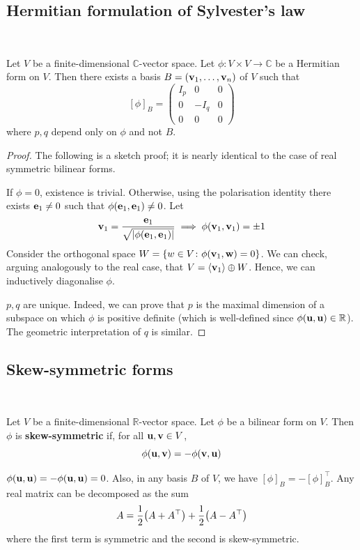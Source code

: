 \documentclass[a4paper,11pt]{article}
\begin{document}
\subsection{Hermitian formulation of Sylvester's law}
\ \vspace*{-1.5em}
\begin{theorem}
	Let \( V \) be a finite-dimensional \( \mathbb C \)-vector space.
	Let \( \phi \colon V \times V \to \mathbb C \) be a Hermitian form on \( V \).
	Then there exists a basis \( B = ({\bf v}_1, \dots, {\bf v}_n) \) of \( V \) such that
	\[
		[\phi]_B = \begin{pmatrix}
			I_p & 0    & 0 \\
			0   & -I_q & 0 \\
			0   & 0    & 0
		\end{pmatrix}
	\]
	where \( p, q \) depend only on \( \phi \) and not \( B \).
\end{theorem}
\begin{proof}
	The following is a sketch proof; it is nearly identical to the case of real symmetric bilinear forms.

	If \( \phi = 0 \), existence is trivial.
	Otherwise, using the polarisation identity there exists \( {\bf e}_1 \neq 0 \) such that \( \phi({\bf e}_1, {\bf e}_1) \neq 0 \).
	Let
	\[
		{\bf v}_1 = \frac{{\bf e}_1}{\sqrt{\abs{\phi({\bf e}_1, {\bf e}_1)}}} \implies \phi({\bf v}_1, {\bf v}_1) = \pm 1
	\]
	Consider the orthogonal space \( W = \qty{w \in V \colon \phi({\bf v}_1, {\bf w}) = 0} \).
	We can check, arguing analogously to the real case, that \( V = \left\langle{} {\bf v}_1 \right\rangle \oplus W \).
	Hence, we can inductively diagonalise \( \phi \).

	\( p, q \) are unique.
	Indeed, we can prove that \( p \) is the maximal dimension of a subspace on which \( \phi \) is positive definite (which is well-defined since \( \phi({\bf u},{\bf u}) \in \mathbb R \)).
	The geometric interpretation of \( q \) is similar.
\end{proof}

\subsection{Skew-symmetric forms}
\ \vspace*{-1.5em}
\begin{definition}
	Let \( V \) be a finite-dimensional \( \mathbb R \)-vector space.
	Let \( \phi \) be a bilinear form on \( V \).
	Then \( \phi \) is \textbf{skew-symmetric} if, for all \( {\bf u},{\bf v} \in V \),
	\[
		\phi({\bf u},{\bf v}) = -\phi({\bf v},{\bf u})
	\]
\end{definition}
\begin{remark}
	\( \phi({\bf u},{\bf u}) = -\phi({\bf u},{\bf u}) = 0 \).
	Also, in any basis \( B \) of \( V \), we have \( [\phi]_B = -[\phi]_B^\top \).
	Any real matrix can be decomposed as the sum
	\[
		A = \frac{1}{2}\qty(A + A^\top) + \frac{1}{2}\qty(A - A^\top)
	\]
	where the first term is symmetric and the second is skew-symmetric.
\end{remark}
\end{document}
